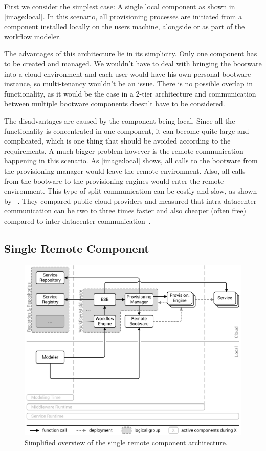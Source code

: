 First we consider the simplest case: A single local component as shown in \autoref{image:local}.
In this scenario, all provisioning processes are initiated from a component installed locally on the users machine, alongside or as part of the workflow modeler.

The advantages of this architecture lie in its simplicity.
Only one component has to be created and managed.
We wouldn't have to deal with bringing the bootware into a cloud environment and each user would have his own personal bootware instance, so multi-tenancy wouldn't be an issue.
There is no possible overlap in functionality, as it would be the case in a 2-tier architecture and communication between multiple bootware components doesn't have to be considered.

The disadvantages are caused by the component being local.
Since all the functionality is concentrated in one component, it can become quite large and complicated, which is one thing that should be avoided according to the requirements.
A much bigger problem however is the remote communication happening in this scenario.
As \autoref{image:local} shows, all calls to the bootware from the provisioning manager would leave the remote environment.
Also, all calls from the bootware to the provisioning engines would enter the remote environment.
This type of split communication can be costly and slow, as shown by \citeauthor*{cloudcmp}~\autocite{cloudcmp}.
They compared public cloud providers and measured that intra-datacenter communication can be two to three times faster and also cheaper (often free) compared to inter-datacenter communication~\autocite{cloudcmp}.

\subsection{Single Remote Component}

\begin{figure}[!htbp]
	\centering
	\includegraphics[resolution=600]{design/assets/remote}
	\caption{Simplified overview of the single remote component architecture.}
	\label{image:remote}
\end{figure}

